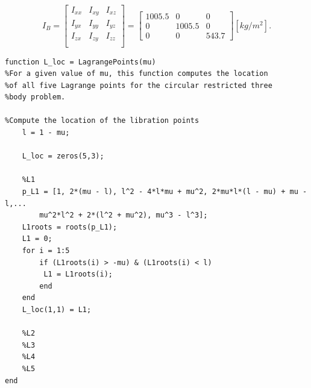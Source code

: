 \begin{equation}
I_{B} =
\begin{bmatrix} 
I_{xx} & I_{xy} & I_{xz} \\
I_{yx} & I_{yy} & I_{yz} \\ 
I_{zx} & I_{zy} & I_{zz} \\
\end{bmatrix}
=
\begin{bmatrix}
1005.5 & 0 & 0 \\
0 & 1005.5 & 0 \\ 
0 & 0 & 543.7
\end{bmatrix}
[kg/m^2].
\end{equation}

\begin{lstlisting}
function L_loc = LagrangePoints(mu)
%For a given value of mu, this function computes the location
%of all five Lagrange points for the circular restricted three
%body problem.

%Compute the location of the libration points
    l = 1 - mu;

    L_loc = zeros(5,3);

    %L1
    p_L1 = [1, 2*(mu - l), l^2 - 4*l*mu + mu^2, 2*mu*l*(l - mu) + mu - l,...
        mu^2*l^2 + 2*(l^2 + mu^2), mu^3 - l^3];
    L1roots = roots(p_L1);
    L1 = 0;
    for i = 1:5
        if (L1roots(i) > -mu) & (L1roots(i) < l)
         L1 = L1roots(i);
        end
    end
    L_loc(1,1) = L1;

    %L2
    %L3
    %L4
    %L5
end
\end{lstlisting}
